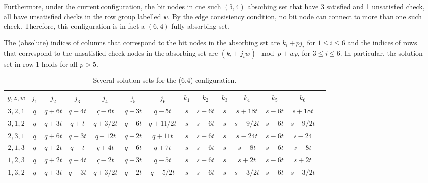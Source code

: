 Furthermore, under the current configuration, the bit nodes in one
such $(6,4)$ absorbing set that have 3 satisfied and 1 unsatisfied
check, all have unsatisfied checks in the row group labelled $w$. By
the edge consistency condition, no bit node can connect to more than
one such check. Therefore, this configuration is in fact a $(6,4)$
fully absorbing set.

The (absolute) indices of columns that correspond to the bit nodes
in the absorbing set are $k_i+pj_i$ for $1 \leq i \leq 6$ and the
indices of rows that correspond to the unsatisfied check nodes in
the absorbing set are $(k_i+j_iw) \mod p+ wp$, for $3\leq i \leq 6$.
In particular, the solution set in row 1 holds for all $p > 5$.

\hspace{-0.95in}\small{\hspace{-0.95in}\begin{table}[ht]\vspace{-0.05in}\hspace{-0.95in}
\begin{tabular}{|c |c|c|c|c|c|c|c|c|c|c|c|c|c|}
  \hline
  $y,z,w$ & $j_1$ & $j_2$ & $j_3$ & $j_4$ & $j_5$ & $j_6$ & $k_1$ & $k_2$ & $k_3$ & $k_4$ & $k_5$ & $k_6$ \\
  \hline
$3,2,1$&  $q$ & $q+6t$ &  $q+4t$ &  $q-6t$ &  $q+3t$ & $q-5t$ & $s$
& $s-6t$ & $s$ & $s+18t$ & $s-6t$ &
  $s+18t$\\
  $3,1,2$&$q$& $q+3t$ &  $q+t$ &    $q+3/2t$ &  $q+6t$ &   $q+11/2t$ & $s$ & $s-6t$ & $s$ & $s-9/2t$ & $s-6t$ &
  $s-9/2t$\\
 $2,3,1$& $q$ & $q+6t$ &  $q+3t$&    $q+12t$ &  $q+2t$ &   $q+11t$ & $s$ & $s-6t$ & $s$ & $s-24t$ & $s-6t$ &
  $s-24$\\
$2,1,3$&  $q$ & $q+2t$ &  $q-t$ &  $q+4t$ &   $q+6t$ &    $q+7t$ &
$s$ & $s-6t$ & $s$ & $s-8t$ & $s-6t$ &
  $s-8t$\\
 $1,2,3$& $q$ & $q+2t$ &  $q-4t$ &    $q-2t$ &    $q+3t$ &    $q-5t$ & $s$ & $s-6t$ & $s$ & $s+2t$ & $s-6t$ &
  $s+2t$\\
  $1,3,2$&$q$ & $q+3t$ &  $q-3t$ &    $q+3/2t$ &  $q+2t$ &   $q-5/2t$ & $s$ & $s-6t$ & $s$ & $s-3/2t$ & $s-6t$ &
  $s-3/2t$\\
  \hline
\end{tabular}
\caption{ Several solution sets for the (6,4)
configuration.}\label{table64}
\end{table}
\normalsize

}
